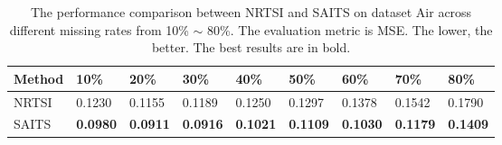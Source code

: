 \documentclass{article}
\begin{document}
\begin{table} [!htb]
	\centering
	\caption{The performance comparison between NRTSI and SAITS on dataset Air across different missing rates from 10\% $\sim$ 80\%. The evaluation metric is MSE. The lower, the better. The best results are in bold.}
	\label{comp_NRTSI_air}
	\begin{tabular}{p{55pt}<{\centering}|p{35pt}<{\centering}|p{35pt}<{\centering}|p{35pt}<{\centering}|p{35pt}<{\centering}|p{35pt}<{\centering}|p{35pt}<{\centering}|p{35pt}<{\centering}|p{35pt}<{\centering}}
		\toprule
		Method        & 10\%     & 20\%      & 30\%     & 40\%      & 50\%     & 60\%      & 70\%     & 80\%     \\
		\midrule
		NRTSI        & 0.1230   & 0.1155    & 0.1189   & 0.1250    & 0.1297   & 0.1378    & 0.1542   & 0.1790   \\
		\midrule
		SAITS         & \textbf{0.0980}   & \textbf{0.0911}    & \textbf{0.0916}   & \textbf{0.1021}    & \textbf{0.1109}   & \textbf{0.1030}    & \textbf{0.1179}   & \textbf{0.1409} \\
		\bottomrule
	\end{tabular}
\end{table}
\end{document}
